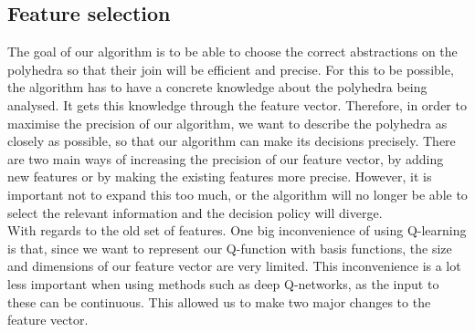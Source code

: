 \subsection{Feature selection}
The goal of our algorithm is to be able to choose the correct abstractions on the polyhedra so that their join will be efficient and precise. For this to be possible, the algorithm has to have a concrete knowledge about the polyhedra being analysed. It gets this knowledge through the feature vector. Therefore, in order to maximise the precision of our algorithm, we want to describe the polyhedra as closely as possible, so that our algorithm can make its decisions precisely. There are two main ways of increasing the precision of our feature vector, by adding new features or by making the existing features more precise. However, it is important not to expand this too much, or the algorithm will no longer be able to select the relevant information and the decision policy will diverge.\\
With regards to the old set of features. One big inconvenience of using Q-learning is that, since we want to represent our Q-function with basis functions, the size and dimensions of our feature vector are very limited. This inconvenience is a lot less important when using methods such as deep Q-networks, as the input to these can be continuous. This allowed us to make two major changes to the feature vector. 

